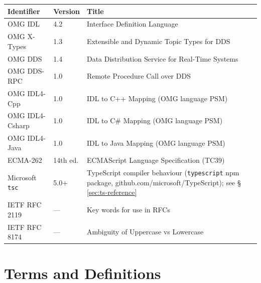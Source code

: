 \documentclass{../styles/zerodds-vendor-spec}
\begin{document}
\begin{longtable}{p{3.4cm}p{2.0cm}p{8.5cm}}
  \toprule
  \textbf{Identifier} & \textbf{Version} & \textbf{Title} \\
  \midrule
  \endhead
  OMG IDL              & 4.2         & Interface Definition Language \\
  OMG X-Types          & 1.3         & Extensible and Dynamic Topic Types for DDS \\
  OMG DDS              & 1.4         & Data Distribution Service for Real-Time Systems \\
  OMG DDS-RPC          & 1.0         & Remote Procedure Call over DDS \\
  OMG IDL4-Cpp         & 1.0         & IDL to C++ Mapping (OMG language PSM) \\
  OMG IDL4-Csharp      & 1.0         & IDL to C\# Mapping (OMG language PSM) \\
  OMG IDL4-Java        & 1.0         & IDL to Java Mapping (OMG language PSM) \\
  ECMA-262             & 14th ed.    & ECMAScript Language Specification (TC39) \\
  Microsoft \texttt{tsc} & 5.0+      & TypeScript compiler behaviour (\texttt{typescript} npm package, github.com/microsoft/TypeScript); see \S\,\ref{sec:ts-reference} \\
  IETF RFC 2119        & ---         & Key words for use in RFCs \\
  IETF RFC 8174        & ---         & Ambiguity of Uppercase vs Lowercase \\
  \bottomrule
\end{longtable}

\chapter{Terms and Definitions}
\end{document}
